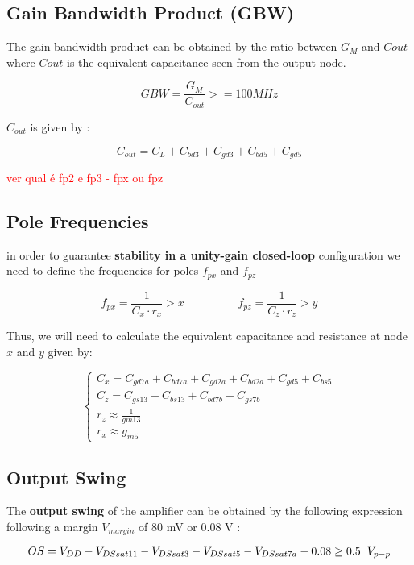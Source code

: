 \subsection{Gain Bandwidth Product (GBW)}
The gain bandwidth product can be obtained by the ratio between $G_M$ and $C{out}$ where $C{out}$ is the equivalent capacitance seen from the output node.

$$  GBW = \frac{G_M}{C_{out}} >= 100 MHz $$

$C_{out}$ is given by :

$$C_{out} = C_L + C_{bd3} + C_{gd3} + C_{bd5} + C_{gd5}$$

\newpage

\textcolor{red}{ver qual é fp2 e fp3 - fpx ou fpz }

\subsection{Pole Frequencies}
in order to guarantee \textbf{stability in a unity-gain closed-loop} configuration we need to define the frequencies
for poles $f_{px}$ and  $f_{pz}$

$$f_{px} = \frac{1}{C_x\cdot r_x} > x  \hspace{2cm}  f_{pz} = \frac{1}{C_z\cdot r_z} > y$$

Thus, we will need to calculate the equivalent capacitance and resistance at node $x$ and $y$ given by:

\begin{equation}
    \begin{cases}
        C_x = C_{gd7a} + C_{bd7a}+ C_{gd2a} + C_{bd2a} + C_{gd5} + C_{bs5}\\
        C_z = C_{gs13} + C_{bs13} + C_{bd7b}+ C_{gs7b} \\
        r_z \approx \frac{1}{gm13} \\
        r_x \approx g_{m5} 
    \end{cases}
\end{equation}

\subsection{Output Swing}
The \textbf{output swing} of the amplifier can be obtained by the following expression following a margin $V_{margin}$ of 80 mV or 0.08 V :

$$OS = V_{DD} - V_{DSsat11} - V_{DSsat3} - V_{DSsat5} - V_{DSsat7a} - 0.08  \geq  0.5 \hspace{0.2cm} V_{p-p}$$

